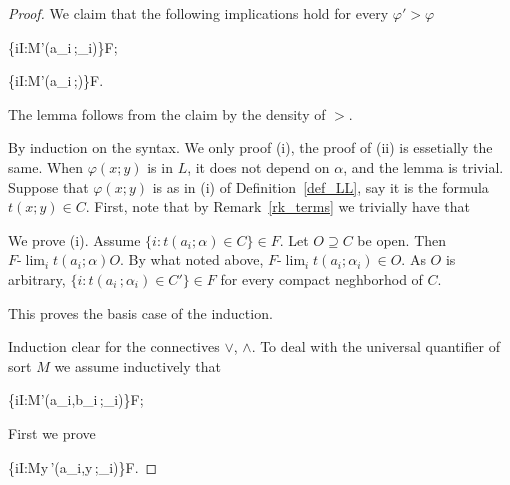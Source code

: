 \documentclass[12pt,letterpaper,oneside,reqno]{amsart}
\newcommand*{\TakeFourierOrnament}[1]{{%
\fontencoding{U}\fontfamily{futs}\selectfont\char#1}}
\renewcommand*{\danger}{\TakeFourierOrnament{66}}
\theoremstyle{plain}
\theoremstyle{remark}
\begin{document}
\begin{proof}
  We claim that the following implications hold for every $\varphi'>\varphi$

  {\Rightarrow}
  {\big\{i\in I:{\EuScript M}\models\varphi'(a_i\,;\alpha_i)\big\}\in F};

  {\Rightarrow}
  {\big\{i\in I:{\EuScript M}\models\varphi'(a_i\,;\alpha)\big\}\in F}.
  
  The lemma follows from the claim by the density of $>$.
  
  By induction on the syntax.
  We only proof (\textsf{i}), the proof of  (\textsf{ii}) is essetially the same.
  When $\varphi(x;y)$ is in $L$, it does not depend on $\alpha$, and the lemma is trivial.
  Suppose that $\varphi(x;y)$ is as in (i) of Definition~\ref{def_LL}, say it is the formula $t(x;y)\in C$.
  First, note that by Remark~\ref{rk_terms} we trivially have that

  
  We prove (\textsf{i}).
  Assume $\{i:t(a_i;\alpha)\in C\}\in F$.
  Let $O\supseteq C$ be open.
  Then $F\mbox{-}\lim_i t(a_i;\alpha)$\in $O$.
  By what noted above, $F\mbox{-}\lim_i t(a_i;\alpha_i)\in O$.
  As $O$ is arbitrary, $\{i:t(a_i\,;\alpha_i)\in C'\}\in F$ for every compact neghborhod of $C$. 

  This proves the basis case of the induction.

  Induction clear for the connectives $\vee$, $\wedge$.
  To deal with the universal quantifier of sort $M$ we assume inductively that

  {\Rightarrow}
  {\big\{i\in I:{\EuScript M}\models\varphi'(a_i,b_i\,;\alpha_i)\big\}\in F};


  First we prove

  {\Rightarrow}
  {\big\{i\in I:{\EuScript M}\models\forall y\,\varphi'(a_i,y\,;\alpha_i)\big\}\in F}.


\end{proof}
\end{document}

